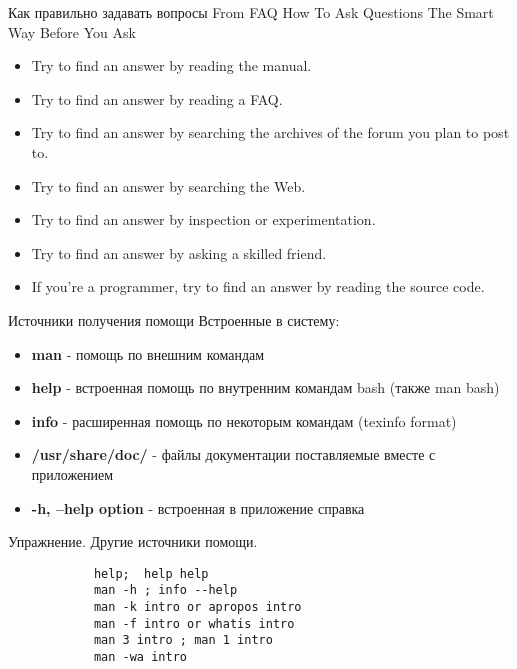 \begin{frame}[fragile]{Как правильно задавать вопросы}
From FAQ How To Ask Questions The Smart Way
Before You Ask
  \begin{itemize}
	  \item Try to find an answer by reading the manual.
	  \item Try to find an answer by reading a FAQ.
	  \item Try to find an answer by searching the archives of the forum you plan to post to.
	  \item Try to find an answer by searching the Web.
	  \item Try to find an answer by inspection or experimentation.
	  \item Try to find an answer by asking a skilled friend.
	  \item If you're a programmer, try to find an answer by reading the source code.
    \end{itemize}
\end{frame}


\begin{frame}[fragile]{Источники получения помощи}
    Встроенные в систему:
\begin{itemize}
    \item \textbf{man} - помощь по внешним командам
    \pause
    \item \textbf{help} - встроенная помощь по внутренним командам bash (также man bash)
    \pause
    \item \textbf{info} - расширенная помощь по некоторым командам (texinfo format)
    \item \textbf{/usr/share/doc/} - файлы документации поставляемые вместе с приложением
    \item \textbf{-h, --help option} - встроенная в приложение справка
\end{itemize}
     \begin{block}{Упражнение. Другие источники помощи.}
        \begin{lstlisting}
            help;  help help
            man -h ; info --help
            man -k intro or apropos intro
            man -f intro or whatis intro
            man 3 intro ; man 1 intro
            man -wa intro
        \end{lstlisting}
    \end{block}
\end{frame}

